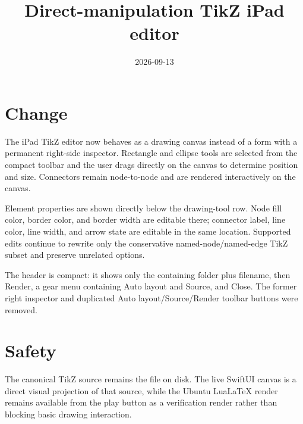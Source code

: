 \documentclass[a4paper]{article}
\title{Direct-manipulation TikZ iPad editor}
\date{2026-09-13}
\author{}
\begin{document}
\maketitle

\section*{Change}
The iPad TikZ editor now behaves as a drawing canvas instead of a form with a permanent right-side inspector. Rectangle and ellipse tools are selected from the compact toolbar and the user drags directly on the canvas to determine position and size. Connectors remain node-to-node and are rendered interactively on the canvas.

Element properties are shown directly below the drawing-tool row. Node fill color, border color, and border width are editable there; connector label, line color, line width, and arrow state are editable in the same location. Supported edits continue to rewrite only the conservative named-node/named-edge TikZ subset and preserve unrelated options.

The header is compact: it shows only the containing folder plus filename, then Render, a gear menu containing Auto layout and Source, and Close. The former right inspector and duplicated Auto layout/Source/Render toolbar buttons were removed.

\section*{Safety}
The canonical TikZ source remains the file on disk. The live SwiftUI canvas is a direct visual projection of that source, while the Ubuntu LuaLaTeX render remains available from the play button as a verification render rather than blocking basic drawing interaction.
\end{document}
